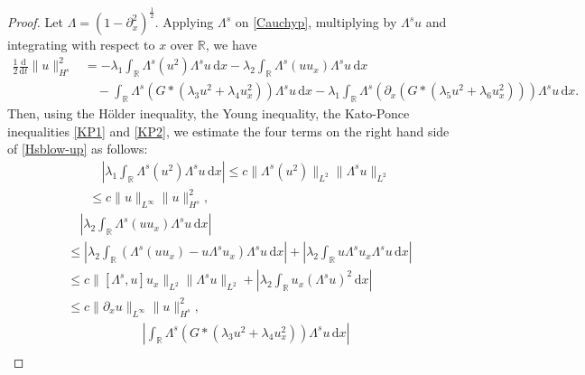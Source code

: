 \documentclass[11pt]{article}
\begin{document}
\begin{proof}
Let $\Lambda=(1-\partial_x^2)^{\tfrac{1}{2}}$. Applying $\Lambda^s$ on \eqref{Cauchyp}, multiplying by
$\Lambda^s u$ and integrating with respect to $x$ over $\mathbb{R}$, we have
\begin{equation}\label{Hsblow-up}
\begin{aligned}
\frac{1}{2}\frac{\mathrm{d}}{\mathrm{d}t}\|u\|_{H^s}^2
&=-\lambda_1\int_{\mathbb{R}}\Lambda^s( u^2)\Lambda^su \,\mathrm{d}x
-\lambda_2\int_{\mathbb{R}}\Lambda^s( u u_x)\Lambda^su \,\mathrm{d}x \\
&\quad-\int_{\mathbb{R}}\Lambda^s( G\ast(\lambda_3 u^2 + \lambda_4 u_x^2))\Lambda^su \,\mathrm{d}x
-\lambda_1\int_{\mathbb{R}}\Lambda^s( \partial_x \left(  G \ast (\lambda_5 u^2 + \lambda_6 u_x^2) \right))\Lambda^su \,\mathrm{d}x.
\end{aligned}
\end{equation}
Then, using the H\"{o}lder inequality, the Young inequality, the Kato-Ponce inequalities \eqref{KP1} and \eqref{KP2}, we estimate the four terms on the right hand side of \eqref{Hsblow-up} as follows:
\begin{equation}\label{Term1}
\begin{aligned}
&\quad\left|\lambda_1\int_{\mathbb{R}}\Lambda^s( u^2)\Lambda^su \,\mathrm{d}x\right|\leq c\|\Lambda^s(u^2)\|_{L^2}\|\Lambda^su\|_{L^2}\\
&\leq c\|u\|_{L^\infty}\|u\|_{H^s}^2,
\end{aligned}
\end{equation}
\begin{equation}\label{Term2}
\begin{aligned}
&\quad\left|\lambda_2\int_{\mathbb{R}}\Lambda^s( uu_x)\Lambda^su \,\mathrm{d}x\right|\\
&\leq\left|\lambda_2\int_{\mathbb{R}}\left(\Lambda^s( uu_x)- u \Lambda^s u_x\right)\Lambda^su \,\mathrm{d}x\right|+\left|\lambda_2\int_{\mathbb{R}} u \Lambda^s u_x\Lambda^su \,\mathrm{d}x\right|\\
&\leq c\|[\Lambda^s,u]u_x\|_{L^2} \|\Lambda^su\|_{L^2}+\left|\lambda_2\int_{\mathbb{R}} u_x (\Lambda^su)^2 \,\mathrm{d}x\right|\\
&\leq c\|\partial_x u\|_{L^\infty}\|u\|_{H^s}^2,
\end{aligned}
\end{equation}
\begin{equation}\label{Term3}
\begin{aligned}
&\quad\left|\int_{\mathbb{R}}\Lambda^s( G\ast(\lambda_3 u^2 + \lambda_4 u_x^2))\Lambda^su \,\mathrm{d}x\right|\\

\end{aligned}
\end{equation}
\end{proof}
\end{document}

